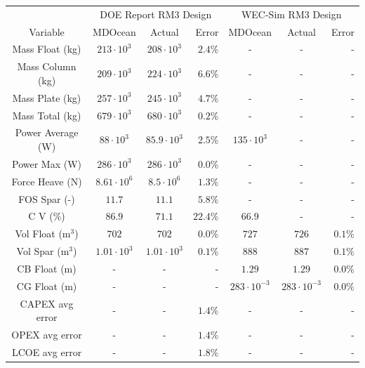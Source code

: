 \begin{tabular}{c|c|c|r|c|c|r}
& \multicolumn{3}{c|}{DOE Report RM3 Design \cite{RM3}} & \multicolumn{3}{c}{WEC-Sim RM3 Design \cite{ruehl_wec-simwec-sim_2025}} \\   
Variable & MDOcean & Actual & Error & MDOcean  & Actual  & Error \\ 
\hline 
Mass Float (kg) & $213 \cdot 10^{3}$ & $208 \cdot 10^{3}$ & $2.4\% $ & - & - & - \\ 
Mass Column (kg) & $209 \cdot 10^{3}$ & $224 \cdot 10^{3}$ & $6.6\% $ & - & - & - \\ 
Mass Plate (kg) & $257 \cdot 10^{3}$ & $245 \cdot 10^{3}$ & $4.7\% $ & - & - & - \\ 
Mass Total (kg) & $679 \cdot 10^{3}$ & $680 \cdot 10^{3}$ & $0.2\% $ & - & - & - \\ 
Power Average (W) & $88 \cdot 10^{3}$ & $85.9 \cdot 10^{3}$ & $2.5\% $ & $135 \cdot 10^{3}$ & - & - \\ 
Power Max (W) & $286 \cdot 10^{3}$ & $286 \cdot 10^{3}$ & $0.0\% $ & - & - & - \\ 
Force Heave (N) & $8.61 \cdot 10^{6}$ & $8.5 \cdot 10^{6}$ & $1.3\% $ & - & - & - \\ 
FOS Spar (-) & $11.7 $ & $11.1 $ & $5.8\% $ & - & - & - \\ 
C V (\%) & $86.9 $ & $71.1 $ & $22.4\% $ & $66.9 $ & - & - \\ 
Vol Float (m$^3$) & $702 $ & $702 $ & $0.0\% $ & $727 $ & $726 $ & $0.1\% $ \\ 
Vol Spar (m$^3$) & $1.01 \cdot 10^{3}$ & $1.01 \cdot 10^{3}$ & $0.1\% $ & $888 $ & $887 $ & $0.1\% $ \\ 
CB Float (m) & - & - & - & $1.29 $ & $1.29 $ & $0.0\% $ \\ 
CG Float (m) & - & - & - & $283 \cdot 10^{-3}$ & $283 \cdot 10^{-3}$ & $0.0\% $ \\ 
CAPEX avg error & - & - & $1.4\% $ & - & - & - \\ 
OPEX avg error & - & - & $1.4\% $ & - & - & - \\ 
LCOE avg error & - & - & $1.8\% $ & - & - & - \\ 
\end{tabular}